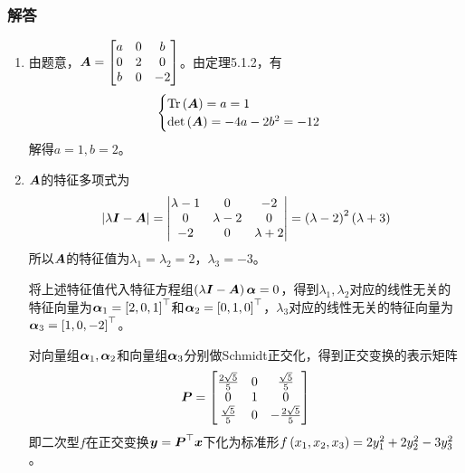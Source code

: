 \documentclass[9pt,xcolor=svgnames]{beamer} %
\begin{document}
\begin{frame}[allowframebreaks]
    \frametitle{解答}
    \begin{enumerate}
        \item {
              由题意，\(\boldsymbol{A}=\begin{bmatrix}a&0&b\\0&2&0\\b&0&-2\end{bmatrix}\)。由定理5.1.2，有
              \begin{equation*}
                  \begin{cases}
                      \mathrm{Tr}\left( \boldsymbol{A} \right)=a=1 \\
                      \mathrm{det}\left( \boldsymbol{A} \right)=-4a-2b^2=-12
                  \end{cases}
              \end{equation*}
              解得\(a=1,b=2\)。
              }
        \item {
              \(\boldsymbol{A}\)的特征多项式为
              \begin{equation*}
                  \left|\lambda\boldsymbol{I}-\boldsymbol{A} \right|=\begin{vmatrix}\lambda-1&0&-2\\0&\lambda-2&0\\-2&0&\lambda+2\end{vmatrix}=\left( \lambda-2 \right)^2\left( \lambda+3 \right)
              \end{equation*}
              所以\(\boldsymbol{A}\)的特征值为\(\lambda_1=\lambda_2=2\)，\(\lambda_3=-3\)。

              将上述特征值代入特征方程组\(\left( \lambda\boldsymbol{I}-\boldsymbol{A} \right)\boldsymbol{\alpha}=0\)，得到\(\lambda_1,\lambda_2\)对应的线性无关的特征向量为\(\boldsymbol{\alpha}_1=\left[ 2,0,1 \right]^\top\)和\(\boldsymbol{\alpha}_2=\left[ 0,1,0 \right]^\top\)，\(\lambda_3\)对应的线性无关的特征向量为\(\boldsymbol{\alpha}_3=\left[ 1,0,-2 \right]^\top\)。

              对向量组\(\boldsymbol{\alpha}_1,\boldsymbol{\alpha}_2\)和向量组\(\boldsymbol{\alpha}_3\)分别做Schmidt正交化，得到正交变换的表示矩阵
              \begin{equation*}
                  \boldsymbol{P}=
                  \begin{bmatrix}
                      \frac{2\sqrt{5}}{5} & 0 & \frac{\sqrt{5}}{5}   \\
                      0                   & 1 & 0                    \\
                      \frac{\sqrt{5}}{5}  & 0 & -\frac{2\sqrt{5}}{5}
                  \end{bmatrix}
              \end{equation*}
              即二次型\(f\)在正交变换\(\boldsymbol{y}=\boldsymbol{P}^\top\boldsymbol{x}\)下化为标准形\(f\left( x_1,x_2,x_3 \right)=2y_1^2+2y_2^2-3y_3^2\)。
              }
    \end{enumerate}
\end{frame}
\end{document}
